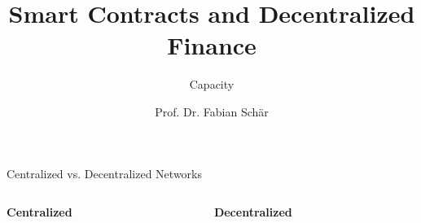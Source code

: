 \documentclass[handout]{beamer}
\title{Smart Contracts and Decentralized Finance}
\subtitle{Capacity}
\author{Prof. Dr. Fabian Schär}
\institute{University of Basel}
\begin{document}
\thispagestyle{empty}
\begin{frame}[noframenumbering]
	\titlepage
\end{frame}


\begin{frame}{Centralized vs. Decentralized Networks}

	\begin{columns}[T]
		\begin{column}{0.5\textwidth}
		\center
			\begin{tikzpicture}[scale=0.56, every node/.style={scale=0.63}]
				
			\end{tikzpicture}
		\end{column}
		\begin{column}{0.5\textwidth}
		\center
			\begin{tikzpicture}[scale=0.63, every node/.style={scale=0.63}]
				
			\end{tikzpicture}
		\end{column}
	\end{columns}
	
	\vspace{1em}
	\begin{columns}[T]
		\begin{column}{0.5\textwidth}
		\center
		\textbf{Centralized}
		\end{column}
		\begin{column}{0.5\textwidth}
		\center
		\textbf{Decentralized}
		\end{column}
		
	\end{columns}
		
	
\end{frame}
\end{document}
